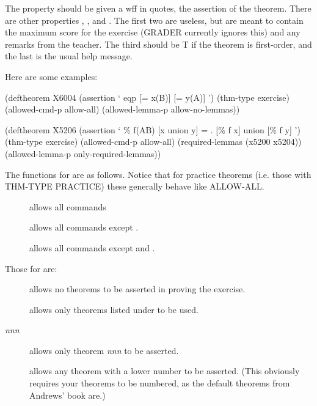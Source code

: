 The  property should be given a wff in quotes, the assertion
of the theorem. There are other properties , ,
 and . The first two are useless, but are meant to contain
the maximum score for the exercise (GRADER currently ignores this) and any remarks from
the teacher. The third should be T if the theorem is first-order, and the last is the usual
help message.

Here are some examples:

\begin{tpsexample}
(deftheorem X6004
  (assertion
   ` eqp [= x(B)] [= y(A)] ')
  (thm-type exercise)
  (allowed-cmd-p allow-all)
  (allowed-lemma-p allow-no-lemmas))

(deftheorem X5206
  (assertion
   ` \% f(AB) [x union y] = . [\% f x] union [\% f y] ')
  (thm-type exercise)
  (allowed-cmd-p allow-all)
  (required-lemmas (x5200 x5204))
  (allowed-lemma-p only-required-lemmas))
\end{tpsexample}

The functions for  are as
follows. Notice that for practice theorems (i.e. those
with THM-TYPE PRACTICE) these generally behave like ALLOW-ALL.

\begin{description}
\item[ ]	 allows all commands

\item[]  
allows all commands except .

\item[ ]	 allows all commands except
 and .
\end{description}

Those for  are:
\begin{description}
\item[ ]	 allows no theorems to be asserted
in proving the exercise.

\item[ ]	 allows only
theorems listed under  to be used.

\item[ {\it nnn} ]	 allows only theorem {\it nnn}
to be asserted.

\item[ ]	 allows any theorem with a lower number
to be asserted. (This obviously requires your theorems to be numbered,
as the default theorems from Andrews' book are.)
\end{description}


